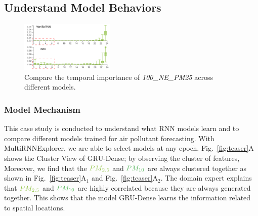\subsection{Understand Model Behaviors}
\begin{figure}[t]
	\centering
	\includegraphics[width=0.40\textwidth]{pictures/Evaluation/FI_comparison.pdf}
	\vspace{-3mm}
	\caption{Compare the temporal importance of \textit{100\_NE\_PM25}  across different models. 
	}
	\label{fig:gru_vs_rnn}
	\vspace{-4mm}
\end{figure}

\subsubsection{Model Mechanism}
This case study is conducted to understand what RNN models learn and to compare different models trained for air pollutant forecasting. 
With MultiRNNExplorer, we are able to select models at any epoch. Fig.~\ref{fig:teaser}A shows the Cluster View of GRU-Dense; by observing the cluster of features, 
Moreover, we find that the $\color{PM25Color}{PM_{2.5}}$ and $\color{PM10Color}{PM_{10}}$ are always clustered together as shown in Fig.~\ref{fig:teaser}A$_1$ and Fig.~\ref{fig:teaser}A$_2$.
The domain expert explains that $\color{PM25Color}{PM_{2.5}}$ and $\color{PM10Color}{PM_{10}}$ are highly correlated because they are always generated together.
This shows that the model GRU-Dense learns the information related to spatial locations.  

